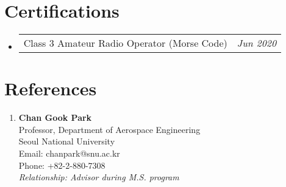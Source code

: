 \documentclass[a4paper,11pt]{article}
\makeatletter
\newcommand{\resumePOR}[3]{
\vspace{0.5mm}\item
    \begin{tabular*}{0.97\textwidth}[t]{l@{\extracolsep{\fill}}r}
        \textbf{#1}\hspace{0.3mm}#2 & \textit{\small{#3}} 
    \end{tabular*}
    \vspace{-2mm}
}
\newcommand{\resumeSubHeadingListStart}{\begin{itemize}[leftmargin=*,labelsep=1mm]}
\newcommand{\resumeSubHeadingListEnd}{\end{itemize}\vspace{2mm}}
\makeatother
\begin{document}
\section{\textbf{Certifications}}
\vspace{-0.2mm}
\resumeSubHeadingListStart

    \resumePOR{}{Class 3 Amateur Radio Operator (Morse Code)}{Jun 2020}

\resumeSubHeadingListEnd






\section{\textbf{References}}
\vspace{-0.2mm}
\small{
    \begin{enumerate}[leftmargin=*,labelsep=2mm]
        \item \textbf{Chan Gook Park}\\
        Professor, Department of Aerospace Engineering\\
        Seoul National University\\
        Email: chanpark@snu.ac.kr\\
        Phone: +82-2-880-7308\\
        \textit{Relationship: Advisor during M.S. program}
    \end{enumerate}
}
\end{document}

